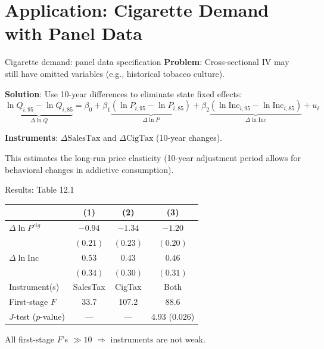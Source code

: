 \documentclass[10pt]{beamer}
\begin{document}
\section{Application: Cigarette Demand with Panel Data}

\begin{frame}{Cigarette demand: panel data specification}
\label{slide:cig_panel}
\textbf{Problem}: Cross-sectional IV may still have omitted variables (e.g., historical tobacco culture).

\textbf{Solution}: Use 10-year differences to eliminate \alert{state fixed effects}:
\[
\underbrace{\ln Q_{i,95} - \ln Q_{i,85}}_{\Delta \ln Q} = \beta_0 + \beta_1 \underbrace{(\ln P_{i,95} - \ln P_{i,85})}_{\Delta \ln P} + \beta_2 \underbrace{(\ln \text{Inc}_{i,95} - \ln \text{Inc}_{i,85})}_{\Delta \ln \text{Inc}} + u_i
\]

\textbf{Instruments}: $\Delta\text{SalesTax}$ and $\Delta\text{CigTax}$ (10-year changes).

\vspace{0.5em}
This estimates the \alert{long-run} price elasticity (10-year adjustment period allows for behavioral changes in addictive consumption).
\end{frame}

\begin{frame}{Results: Table 12.1}
\label{slide:table121}
\begin{table}
\centering
\small
\renewcommand{\arraystretch}{1.2}
\begin{tabular}{@{}lccc@{}}
\toprule
& \textbf{(1)} & \textbf{(2)} & \textbf{(3)} \\
\midrule
$\Delta\ln P^{cig}$ & $-0.94$ & $-1.34$ & $-1.20$ \\
& $(0.21)$ & $(0.23)$ & $(0.20)$ \\[2pt]
$\Delta\ln\text{Inc}$ & $0.53$ & $0.43$ & $0.46$ \\
& $(0.34)$ & $(0.30)$ & $(0.31)$ \\[4pt]
\midrule
Instrument(s) & SalesTax & CigTax & Both \\[2pt]
First-stage $F$ & \alert{33.7} & \alert{107.2} & \alert{88.6} \\[2pt]
$J$-test ($p$-value) & --- & --- & 4.93 (0.026) \\
\bottomrule
\end{tabular}
\end{table}

\vspace{0.3em}
All first-stage $F$'s $\gg 10$ $\Rightarrow$ instruments are \alert{not weak}.
\end{frame}
\end{document}
